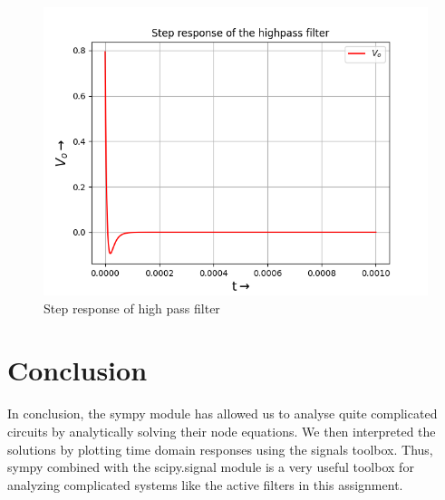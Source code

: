 \documentclass{article}
\begin{document}
\begin{figure}[h!]
\centering
\includegraphics[scale=0.6]{Figure_9}
\caption{Step response of high pass filter}
\label{fig:System Response with Decay = 0.05}
\end{figure}

\section{Conclusion}


    In conclusion, the sympy module has allowed us to analyse quite complicated circuits by analytically solving their node equations. We then interpreted the solutions by plotting time domain responses using the signals toolbox. Thus, sympy combined with the scipy.signal module is a very useful toolbox for analyzing complicated systems like the active filters in this assignment.
\end{document}
